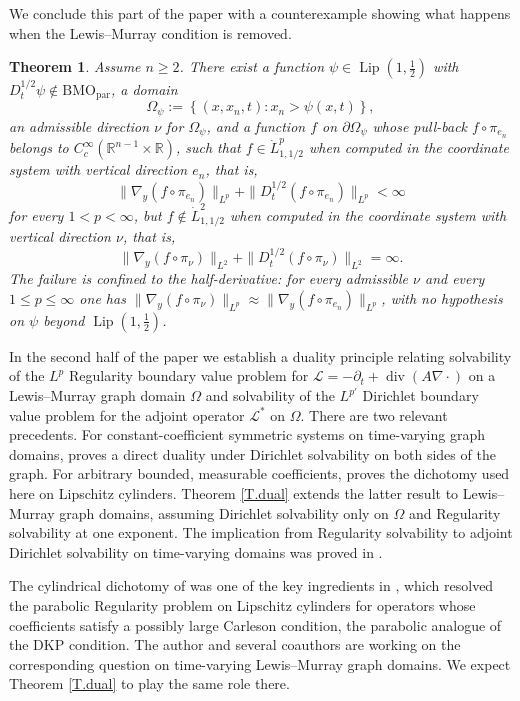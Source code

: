 \documentclass[10pt,a4paper]{amsart}
\numberwithin{equation}{section}
\DeclareMathOperator{\Lip}{Lip}
\DeclareMathOperator{\divg}{div}
\newcommand{\R}{\mathbb R}
\newcommand{\set}[1]{\left\{#1\right\}}
\newcommand{\om}{\Omega}
\newcommand{\pd}{\partial}
\newcommand{\dhalf}{D_t^{1/2}}
\newcommand{\BMOpar}{\mathrm{BMO}_{\mathrm{par}}}
\newcommand{\LL}{\mathcal L}
\newtheorem{theorem}[equation]{Theorem}
\begin{document}
We conclude this part of the paper with a counterexample showing what happens
when the Lewis--Murray condition is removed.

\begin{theorem}\label{T.counter}
Assume $n\ge2$. There exist a function $\psi\in\Lip(1,\tfrac12)$ with
$\dhalf\psi\notin\BMOpar$, a domain
$$\om_\psi:=\set{(x,x_n,t):x_n>\psi(x,t)},$$
an admissible direction $\nu$ for $\om_\psi$, and a function $f$ on
$\pd\om_\psi$ whose pull-back $f\circ\pi_{e_n}$ belongs to
$C^\infty_c(\R^{n-1}\times\R)$, such that $f\in\dot L^{p}_{1,1/2}$ when
computed in the coordinate system with vertical direction $e_n$, that is,
$$\|\nabla_y (f\circ\pi_{e_n})\|_{L^p}+\|\dhalf (f\circ\pi_{e_n})\|_{L^p}<\infty$$
for every $1<p<\infty$, but $f\notin\dot L^{2}_{1,1/2}$ when computed in the
coordinate system with vertical direction $\nu$, that is,
$$\|\nabla_y (f\circ\pi_{\nu})\|_{L^2}+\|\dhalf (f\circ\pi_{\nu})\|_{L^2}=\infty.$$
The failure is confined to the half-derivative: for every admissible $\nu$ and
every $1\le p\le\infty$ one has $\|\nabla_y(f\circ\pi_\nu)\|_{L^{p}}
\approx\|\nabla_y(f\circ\pi_{e_n})\|_{L^{p}}$, with no hypothesis on $\psi$
beyond $\Lip(1,\tfrac12)$.
\end{theorem}

In the second half of the paper we establish a duality principle relating
solvability of the $L^p$ Regularity boundary value problem for
$\LL=-\pd_t+\divg(A\nabla\cdot)$ on a Lewis--Murray graph domain $\om$ and
solvability of the $L^{p'}$ Dirichlet boundary value problem for the adjoint
operator $\LL^*$ on $\om$. There are
two relevant precedents. For constant-coefficient symmetric systems on
time-varying graph domains, \cite[Theorem 4]{Nys06} proves a direct duality
under Dirichlet solvability on both sides of the graph. For arbitrary bounded,
measurable coefficients, \cite{DN} proves the dichotomy used here on Lipschitz
cylinders. Theorem \ref{T.dual} extends the latter result to Lewis--Murray
graph domains, assuming Dirichlet solvability only on $\om$ and Regularity
solvability at one exponent. The implication from Regularity solvability to
adjoint Dirichlet solvability on time-varying domains was proved in
\cite{DD}.\medskip

The cylindrical dichotomy of \cite{DN} was one of the key ingredients in
\cite{DLP}, which resolved the parabolic Regularity problem on Lipschitz
cylinders for operators whose coefficients satisfy a possibly large Carleson
condition, the parabolic analogue of the DKP condition. The author and several
coauthors are working on the corresponding question on time-varying
Lewis--Murray graph domains. We expect Theorem \ref{T.dual} to play the same
role there.\medskip
\end{document}
